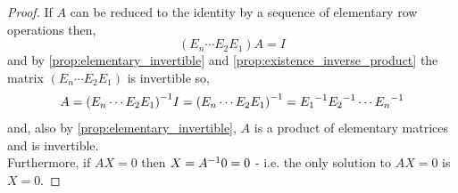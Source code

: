 \documentclass[MathsNotesBase.tex]{subfiles}
\begin{document}
{		
		\begin{proof}
			If $A$ can be reduced to the identity by a sequence of elementary row operations then,
			\[ (E_n\cdots E_2E_1)A = I \]
			and by \autoref{prop:elementary_invertible} and \autoref{prop:existence_inverse_product} the matrix $(E_n\cdots E_2E_1)$ is invertible so,
			\[ A = {(E_n\cdots E_2E_1)}^{-1}I = {(E_n\cdots E_2E_1)}^{-1} = {E_1}^{-1}{E_2}^{-1}\cdots {E_n}^{-1} \]
			and, also by \autoref{prop:elementary_invertible}, $A$ is a product of elementary matrices and is invertible.\\
			Furthermore, if $AX = 0$ then $X = {A}^{-1}0 = 0$ - i.e. the only solution to $AX = 0$ is $X = 0$.
		\end{proof}
	}
	
	
	
\end{document}
